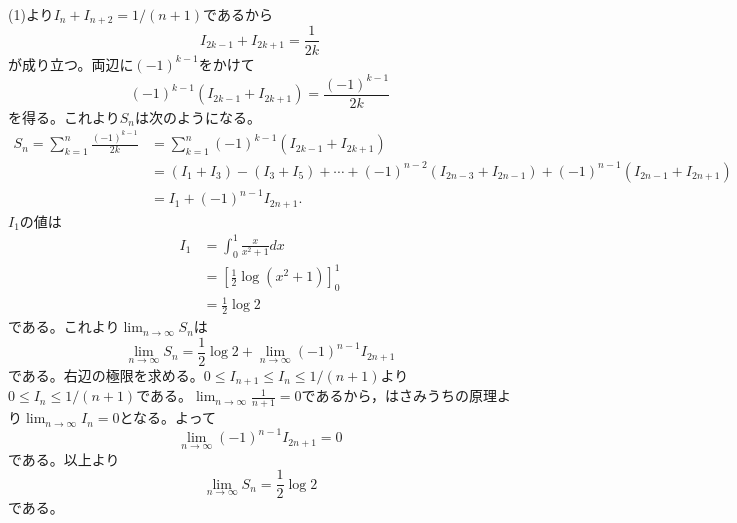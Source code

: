 \documentclass[11pt,a4paper]{jsarticle}
\begin{document}
(1)より$I_{n}+I_{n+2}=1/(n+1)$であるから
\[I_{2k-1}+I_{2k+1}=\frac{1}{2k}\]
が成り立つ。両辺に$(-1)^{k-1}$をかけて
\[(-1)^{k-1}\left(I_{2 k-1}+I_{2 k+1}\right)=\frac{(-1)^{k-1}}{2 k}\]
を得る。これより$S_{n}$は次のようになる。
\[\begin{aligned}
  S_{n}=\sum_{k=1}^{n} \frac{(-1)^{k-1}}{2 k} &=\sum_{k=1}^{n}(-1)^{k-1}\left(I_{2 k-1}+I_{2 k+1}\right) \\
  &=\left(I_{1}+I_{3}\right)-\left(I_{3}+I_{5}\right)+\cdots+(-1)^{n-2}\left(I_{2 n-3}+I_{2 n-1}\right)+(-1)^{n-1}\left(I_{2 n-1}+I_{2 n+1}\right) \\
  &=I_{1}+(-1)^{n-1} I_{2 n+1}.
\end{aligned}\]
$I_{1}$の値は
\[\begin{aligned}
  I_{1} &=\int_{0}^{1} \frac{x}{x^{2}+1} d x \\
  &=\left[\frac{1}{2} \log \left(x^{2}+1\right)\right]_{0}^{1} \\
  &=\frac{1}{2} \log 2
\end{aligned}\]
である。これより$\displaystyle \lim _{n \rightarrow \infty} S_{n}$は
\[\lim _{n \rightarrow \infty} S_{n}=\frac{1}{2} \log 2+\lim _{n \rightarrow \infty}(-1)^{n-1} I_{2 n+1}\]
である。右辺の極限を求める。$0 \leq I_{n+1} \leq I_{n} \leq 1/(n+1)$より$0 \leq I_{n} \leq 1/(n+1)$である。$\displaystyle \lim _{n \rightarrow \infty} \frac{1}{n+1}=0$であるから，はさみうちの原理より$\displaystyle \lim _{n \rightarrow \infty} I_{n}=0$となる。よって
\[\lim _{n \rightarrow \infty}(-1)^{n-1} I_{2 n+1}=0\]
である。以上より
\[\lim _{n \rightarrow \infty} S_{n}=\frac{1}{2} \log 2\]
である。
\end{document}
